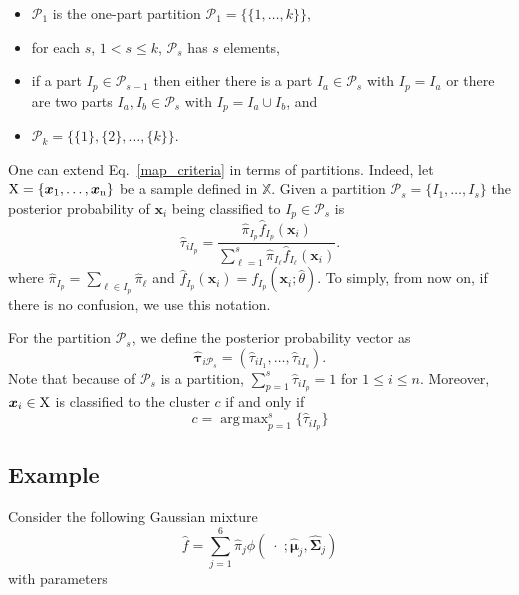 \documentclass[10pt, a4paper]{article}
\DeclareMathOperator*{\argmax}{arg\,max}
\newcommand{\m}[1]{\boldsymbol{#1}}
\begin{document}
\begin{spacing}{1.9}
\begin{itemize}
\item $\mathcal{P}_1$ is the one-part partition $\mathcal{P}_1 = \{ \{1, \dots, k\} \}$,
\item for each $s$, $1 <  s \leq k$, $\mathcal{P}_{s}$ has $s$ elements,
\item if a part $I_p \in \mathcal{P}_{s-1}$ then either there is a part $I_a \in \mathcal{P}_{s}$ with $I_p = I_a$ or there are two parts $I_a, I_b \in \mathcal{P}_s$ with $I_p = I_a \cup I_b$, and
\item $\mathcal{P}_k= \{ \{1\},\{2\}, \dots, \{k\} \}$.
\end{itemize}



One can extend Eq.~\ref{map_criteria} in terms of partitions. Indeed, let $\rm X = \{\m x_1,\dots, \m x_n\}$ be a sample defined in $\mathbb{X}$. Given a partition $\mathcal{P}_s = \{ I_1, \dots, I_s \}$ the posterior probability of $\m x_i$ being classified to $I_p\in \mathcal{P}_{s}$ is
\[
\hat{\tau}_{i I_p} =  \frac{ \hat{\pi}_{I_p} \hat{f}_{I_p}(\m x_i) }{\sum_{\ell=1}^s \hat{\pi}_{I_\ell} \hat{f}_{I_\ell}(\m x_i)}.
\]
where $\hat{\pi}_{I_p} = \sum_{\ell \in I_p} \hat{\pi}_\ell$ and $\hat{f}_{I_p}(\m x_i) = f_{I_p}(\m x_i; \hat{\theta})$. To simply, from now on, if there is no confusion, we use this notation. 

For the partition  $\mathcal{P}_s$, we define the posterior probability vector as
\[
\hat{\m\tau}_{i \mathcal{P}_s} = \left( \hat{\tau}_{i I_1} , \dots, \hat{\tau}_{i I_s}  \right).
\]
Note that because of $\mathcal{P}_s$ is a partition, $\sum_{p=1}^s \hat{\tau}_{i I_p} = 1$ for $1 \leq i \leq n$.
Moreover, $\m x_i \in \rm X$ is classified to the cluster $c$ if and only if
\begin{equation}\label{cluster_criteria}
c= \argmax_{p=1}^s \{ \hat{\tau}_{i I_p} \}
\end{equation}

\subsection{Example}

Consider the following Gaussian mixture
\[
\hat{f} = \sum_{j=1}^6 \hat{\pi}_j \phi(\;\cdot\; ; \hat{\m\mu}_j, \hat{\m\Sigma}_j)
\]
with parameters
{\small  }











\end{spacing}
\end{document}
